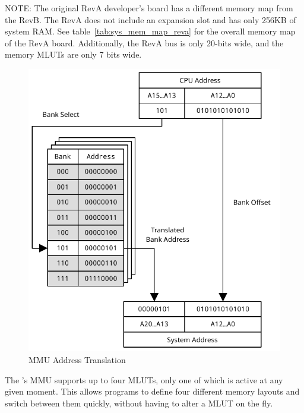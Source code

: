 \begin{leftbar}
NOTE: The original RevA developer's board has a different memory map from the RevB. The RevA does not include an expansion slot and has only 256KB of system RAM. See table~\ref{tab:sys_mem_map_reva} for the overall memory map of the RevA board. Additionally, the RevA bus is only 20-bits wide, and the memory MLUTs are only 7 bits wide.
\end{leftbar}

\begin{figure}[ht]
    \begin{center}
        \includegraphics{images/mmu_address_xlate.pdf}
    \end{center}
    \caption{MMU Address Translation}
    \label{fig:mmu_address_xlate}
\end{figure}

The \jr's MMU supports up to four MLUTs, only one of which is active at any given moment. This allows programs to define four different memory layouts and switch between them quickly, without having to alter a MLUT on the fly.

